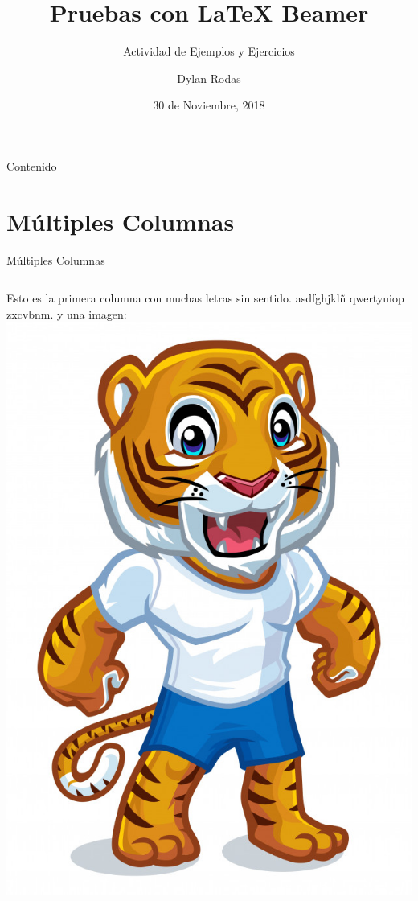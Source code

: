 \documentclass{IFES-beamer}
\title[Pruebas con LaTeX Beamer]{Pruebas con LaTeX Beamer}
\subtitle{Actividad de Ejemplos y Ejercicios}
\author{Dylan Rodas}
\institute[UNIS]{
  Universidad del Istmo de Guatemala\\
  Facultad de Ingeniería
}
\date{30 de Noviembre, 2018}
\begin{document}
\begin{frame}
  \titlepage
\end{frame}

\begin{frame}{Contenido}
  \tableofcontents
\end{frame}

\section{Múltiples Columnas}
\begin{frame}{Múltiples Columnas}

\begin{columns}
\begin{column}{0.5\textwidth}
Esto es la primera columna con muchas letras sin sentido. asdfghjklñ qwertyuiop zxcvbnm. y una imagen: \includegraphics[scale=0.25]{Resources/Tigre.jpg}

\end{column}
\end{columns}
\end{frame}
\end{document}
